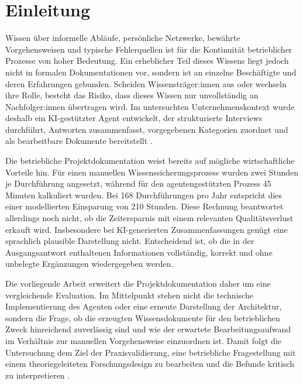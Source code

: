 \documentclass[
  10pt,
  ngerman,
  a4paper,
  toc=graduated,
  numbers=noenddot,
  headings=standardclasses,
  nonumberlist
]{scrartcl}
\begin{document}

\newpage
\cleardoublepage{}
{}
\listoftables

\newpage
{}
\renewcommand{\thepage}{\arabic{page}}
\setcounter{table}{0}

\section{Einleitung}
\label{sec:einleitung}

Wissen über informelle Abläufe, persönliche Netzwerke, bewährte Vorgehensweisen und typische Fehlerquellen ist für die Kontinuität betrieblicher Prozesse von hoher Bedeutung. Ein erheblicher Teil dieses Wissens liegt jedoch nicht in formalen Dokumentationen vor, sondern ist an einzelne Beschäftigte und deren Erfahrungen gebunden. Scheiden Wissensträger:innen aus oder wechseln ihre Rolle, besteht das Risiko, dass dieses Wissen nur unvollständig an Nachfolger:innen übertragen wird. Im untersuchten Unternehmenskontext wurde deshalb ein KI-gestützter Agent entwickelt, der strukturierte Interviews durchführt, Antworten zusammenfasst, vorgegebenen Kategorien zuordnet und als bearbeitbare Dokumente bereitstellt \cite{sommer2026projekt}.

Die betriebliche Projektdokumentation weist bereits auf mögliche wirtschaftliche Vorteile hin. Für einen manuellen Wissenssicherungsprozess wurden zwei Stunden je Durchführung angesetzt, während für den agentengestützten Prozess 45 Minuten kalkuliert wurden. Bei 168 Durchführungen pro Jahr entspricht dies einer modellierten Einsparung von 210 Stunden. Diese Rechnung beantwortet allerdings noch nicht, ob die Zeitersparnis mit einem relevanten Qualitätsverlust erkauft wird. Insbesondere bei KI-generierten Zusammenfassungen genügt eine sprachlich plausible Darstellung nicht. Entscheidend ist, ob die in der Ausgangsantwort enthaltenen Informationen vollständig, korrekt und ohne unbelegte Ergänzungen wiedergegeben werden.

Die vorliegende Arbeit erweitert die Projektdokumentation daher um eine vergleichende Evaluation. Im Mittelpunkt stehen nicht die technische Implementierung des Agenten oder eine erneute Darstellung der Architektur, sondern die Frage, ob die erzeugten Wissensdokumente für den betrieblichen Zweck hinreichend zuverlässig sind und wie der erwartete Bearbeitungsaufwand im Verhältnis zur manuellen Vorgehensweise einzuordnen ist. Damit folgt die Untersuchung dem Ziel der Praxisvalidierung, eine betriebliche Fragestellung mit einem theoriegeleiteten Forschungsdesign zu bearbeiten und die Befunde kritisch zu interpretieren \cite{bhh2023}.
\end{document}
